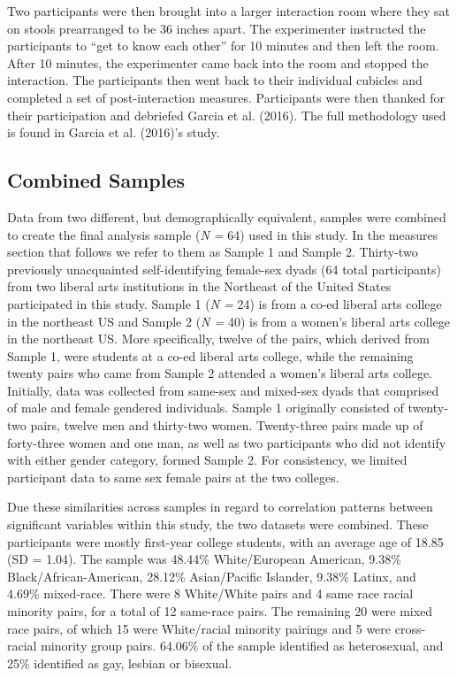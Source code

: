\documentclass[man]{apa6}
\begin{document}
Two participants were then brought into a larger interaction room where
they sat on stools prearranged to be 36 inches apart. The experimenter
instructed the participants to \enquote{get to know each other} for 10
minutes and then left the room. After 10 minutes, the experimenter came
back into the room and stopped the interaction. The participants then
went back to their individual cubicles and completed a set of
post-interaction measures. Participants were then thanked for their
participation and debriefed Garcia et al. (2016). The full methodology
used is found in Garcia et al. (2016)'s study.

\subsection{Combined Samples}\label{combined-samples}

Data from two different, but demographically equivalent, samples were
combined to create the final analysis sample (\emph{N =} 64) used in
this study. In the measures section that follows we refer to them as
Sample 1 and Sample 2. Thirty-two previously unacquainted
self-identifying female-sex dyads (64 total participants) from two
liberal arts institutions in the Northeast of the United States
participated in this study. Sample 1 (\emph{N =} 24) is from a co-ed
liberal arts college in the northeast US and Sample 2 (\emph{N =} 40) is
from a women's liberal arts college in the northeast US. More
specifically, twelve of the pairs, which derived from Sample 1, were
students at a co-ed liberal arts college, while the remaining twenty
pairs who came from Sample 2 attended a women's liberal arts college.
Initially, data was collected from same-sex and mixed-sex dyads that
comprised of male and female gendered individuals. Sample 1 originally
consisted of twenty-two pairs, twelve men and thirty-two women.
Twenty-three pairs made up of forty-three women and one man, as well as
two participants who did not identify with either gender category,
formed Sample 2. For consistency, we limited participant data to same
sex female pairs at the two colleges.

Due these similarities across samples in regard to correlation patterns
between significant variables within this study, the two datasets were
combined. These participants were mostly first-year college students,
with an average age of 18.85 (SD = 1.04). The sample was 48.44\%
White/European American, 9.38\% Black/African-American, 28.12\%
Asian/Pacific Islander, 9.38\% Latinx, and 4.69\% mixed-race. There were
8 White/White pairs and 4 same race racial minority pairs, for a total
of 12 same-race pairs. The remaining 20 were mixed race pairs, of which
15 were White/racial minority pairings and 5 were cross-racial minority
group pairs. 64.06\% of the sample identified as heterosexual, and 25\%
identified as gay, lesbian or bisexual.
\end{document}
